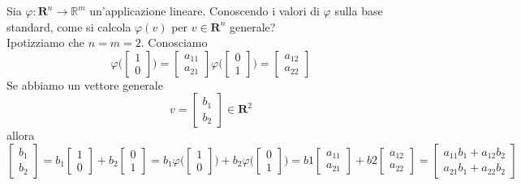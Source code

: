 \begin{example}
	Sia $\varphi: \mathbf{R}^n \rightarrow \mathbb{R}^m$ un'applicazione lineare. Conoscendo i valori di $\varphi$ sulla base standard, come si calcola $\varphi(v)$ per $v \in \mathbf{R}^n$ generale?\\
	Ipotizziamo che $n = m = 2$. Conosciamo
	\begin{equation*}
		\varphi \bigg(
		\begin{bmatrix}
			1 \\ 0
		\end{bmatrix}
		\bigg) = 
		\begin{bmatrix}
			a_{11} \\
			a_{21}
		\end{bmatrix}
		\varphi \bigg(
		\begin{bmatrix}
			0 \\ 1
		\end{bmatrix}
		\bigg) = 
		\begin{bmatrix}
			a_{12} \\
			a_{22}
		\end{bmatrix}
	\end{equation*}
	Se abbiamo un vettore generale
	\begin{equation*}
		v = \begin{bmatrix}
			b_1 \\ b_2
		\end{bmatrix} \in \mathbf{R}^2
	\end{equation*}
	allora
	\begin{equation*}
		\begin{bmatrix}
			b_1 \\ b_2
		\end{bmatrix} = 
		b_1 \begin{bmatrix}
			1 \\ 0
		\end{bmatrix} + 
		b_2 \begin{bmatrix}
			0 \\ 1
		\end{bmatrix} = 
		b_1
		\varphi \bigg(
		\begin{bmatrix}
			1 \\ 0
		\end{bmatrix} \bigg) +
		b_2 \varphi \bigg( \begin{bmatrix}
			0 \\ 1
		\end{bmatrix}
		\bigg) =
		b1 \begin{bmatrix}
			a_{11} \\ a_{21}
		\end{bmatrix} +
		b2 \begin{bmatrix}
			a_{12} \\ a_{22}
		\end{bmatrix} =
		\begin{bmatrix}
			a_{11}b_1 + a_{12}b_2 \\
			a_{21}b_1 + a_{22}b_2 
		\end{bmatrix}
	\end{equation*}
\end{example}

